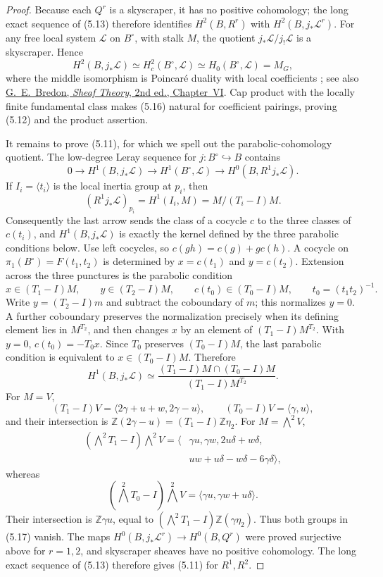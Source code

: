 \begin{proof}
Because each \(Q^r\) is a skyscraper, it has no positive cohomology; the
long exact sequence of (5.13) therefore identifies
\(H^2(B,R^r)\) with \(H^2(B,j_*\mathcal L^r)\).
For any free local system \(\mathcal L\) on \(B^\circ\), with stalk \(M\),
the quotient \(j_*\mathcal L/j_!\mathcal L\) is a skyscraper.  Hence
\[
 H^2(B,j_*\mathcal L)\simeq H_c^2(B^\circ,\mathcal L)\simeq
 H_0(B^\circ,\mathcal L)=M_G,
\tag{5.16}
\]
where the middle isomorphism is Poincar\'e duality with local coefficients
\cite[\S3.H]{Hatcher2002}; see also
\href{https://doi.org/10.1007/978-1-4612-0647-7}{G.~E.~Bredon,
\emph{Sheaf Theory}, 2nd ed., Chapter~VI}.
Cap product with the locally finite fundamental class makes (5.16) natural
for coefficient pairings, proving (5.12) and the product assertion.

It remains to prove (5.11), for which we spell out the parabolic-cohomology
quotient.  The low-degree Leray sequence for \(j:B^\circ\hookrightarrow B\)
contains
\[
 0\longrightarrow H^1(B,j_*\mathcal L)
 \longrightarrow H^1(B^\circ,\mathcal L)
 \longrightarrow H^0(B,R^1j_*\mathcal L).
\]
If \(I_i=\langle t_i\rangle\) is the local inertia group at \(p_i\), then
\[
 (R^1j_*\mathcal L)_{p_i}
 =H^1(I_i,M)=M/(T_i-I)M.
\]
Consequently the last arrow sends the class of a cocycle \(c\) to the three
classes of \(c(t_i)\), and \(H^1(B,j_*\mathcal L)\) is exactly the kernel
defined by the three parabolic conditions below.  Use left cocycles, so
\(c(gh)=c(g)+g c(h)\).  A cocycle on
\(\pi_1(B^\circ)=F(t_1,t_2)\) is determined by
\(x=c(t_1)\) and \(y=c(t_2)\).  Extension across the three punctures is the
parabolic condition
\[
 x\in(T_1-I)M,\qquad y\in(T_2-I)M,\qquad
 c(t_0)\in(T_0-I)M,
 \qquad t_0=(t_1t_2)^{-1}.
\]
Write \(y=(T_2-I)m\) and subtract the coboundary of \(m\); this normalizes
\(y=0\).  A further coboundary preserves the normalization precisely when
its defining element lies in \(M^{T_2}\), and then changes \(x\) by an
element of \((T_1-I)M^{T_2}\).  With \(y=0\),
\(c(t_0)=-T_0x\).  Since \(T_0\) preserves
\((T_0-I)M\), the last parabolic condition is equivalent to
\(x\in(T_0-I)M\).  Therefore
\[
 H^1(B,j_*\mathcal L)\simeq
 \frac{(T_1-I)M\cap(T_0-I)M}{(T_1-I)M^{T_2}}.
\tag{5.17}
\]
For \(M=V\),
\[
(T_1-I)V=\langle2\gamma+u+w,2\gamma-u\rangle,\qquad
(T_0-I)V=\langle\gamma,u\rangle,
\]
and their intersection is
\(\mathbb Z(2\gamma-u)=(T_1-I)\mathbb Z\eta_2\).  For
\(M=\bigwedge^2V\),
\[
\begin{aligned}
(\textstyle\bigwedge^2T_1-I)\textstyle\bigwedge^2V
=\langle&\gamma u,\gamma w,2u\delta+w\delta,\\
&uw+u\delta-w\delta-6\gamma\delta\rangle,
\end{aligned}
\]
whereas
\[
(\textstyle\bigwedge^2T_0-I)\textstyle\bigwedge^2V
=\langle\gamma u,\gamma w+u\delta\rangle.
\]
Their intersection is \(\mathbb Z\gamma u\), equal to
\((\bigwedge^2T_1-I)\mathbb Z(\gamma\eta_2)\).  Thus both groups in
(5.17) vanish.  The maps
\(H^0(B,j_*\mathcal L^r)\to H^0(B,Q^r)\) were proved surjective above for
\(r=1,2\), and skyscraper sheaves have no positive cohomology.  The long
exact sequence of (5.13) therefore gives (5.11) for \(R^1,R^2\).
\end{proof}

